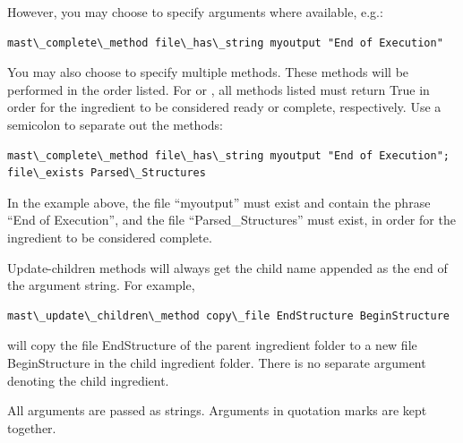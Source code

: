 \documentclass[letterpaper,10pt,english]{sphinxmanual}
\begin{document}
However, you may choose to specify arguments where available, e.g.:

\begin{Verbatim}[commandchars=\\\{\}]
mast\_complete\_method file\_has\_string myoutput "End of Execution"
\end{Verbatim}

You may also choose to specify multiple methods. These methods will be performed in the order listed. For  or , all methods listed must return True in order for the ingredient to be considered ready or complete, respectively.
Use a semicolon to separate out the methods:

\begin{Verbatim}[commandchars=\\\{\}]
mast\_complete\_method file\_has\_string myoutput "End of Execution"; file\_exists Parsed\_Structures
\end{Verbatim}

In the example above, the file ``myoutput'' must exist and contain the phrase ``End of Execution'', and the file ``Parsed\_Structures'' must exist, in order for the ingredient to be considered complete.

Update-children methods will always get the child name appended as the end of the argument string. For example,

\begin{Verbatim}[commandchars=\\\{\}]
mast\_update\_children\_method copy\_file EndStructure BeginStructure
\end{Verbatim}

will copy the file EndStructure of the parent ingredient folder to a new file BeginStructure in the child ingredient folder. There is no separate argument denoting the child ingredient.

All arguments are passed as strings. Arguments in quotation marks are kept together.
\end{document}

